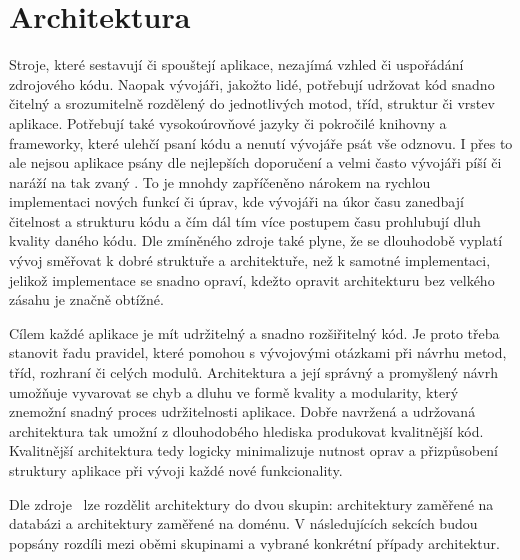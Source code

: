\section{Architektura}

Stroje,
které sestavují či spouštejí aplikace,
nezajímá vzhled či uspořádání zdrojového kódu.
Naopak vývojáři,
jakožto lidé,
potřebují udržovat kód snadno čitelný a srozumitelně rozdělený do jednotlivých
motod, tříd, struktur či vrstev aplikace.
Potřebují také vysokoúrovňové jazyky či pokročilé knihovny a frameworky,
které ulehčí psaní kódu a nenutí vývojáře psát vše odznovu.
I přes to ale nejsou aplikace psány dle nejlepších doporučení
a velmi často vývojáři píší či naráží na tak zvaný .
To je mnohdy zapříčeněno nárokem na rychlou implementaci nových funkcí či úprav,
kde vývojáři na úkor času zanedbají čitelnost a strukturu kódu
a čím dál tím více postupem času prohlubují dluh kvality daného kódu.
\cite{architecture}
\cite{martin_clean_architecture}
Dle zmíněného zdroje také plyne,
že se dlouhodobě vyplatí vývoj směřovat k dobré struktuře a architektuře,
než k samotné implementaci,
jelikož implementace se snadno opraví,
kdežto opravit architekturu bez velkého zásahu je značně obtížné.
\cite{martin_clean_architecture}

Cílem každé aplikace je mít udržitelný a snadno rozšiřitelný kód.
Je proto třeba stanovit řadu pravidel,
které pomohou s vývojovými otázkami při návrhu metod, tříd, rozhraní či
celých modulů.
Architektura a její správný a promyšlený návrh umožňuje vyvarovat
se chyb a dluhu ve formě kvality a modularity,
který znemožní snadný proces udržitelnosti aplikace.
\cite{martin_clean_architecture}
Dobře navržená a udržovaná architektura tak umožní z dlouhodobého hlediska
produkovat kvalitnější kód.
Kvalitnější architektura tedy logicky minimalizuje nutnost oprav a
přizpůsobení struktury aplikace při vývoji každé nové funkcionality.

Dle zdroje~\cite{architecture} lze rozdělit architektury do dvou skupin:
architektury zaměřené na databázi a architektury zaměřené na doménu.
V následujících sekcích budou popsány rozdíli mezi oběmi skupinami
a vybrané konkrétní případy architektur.

